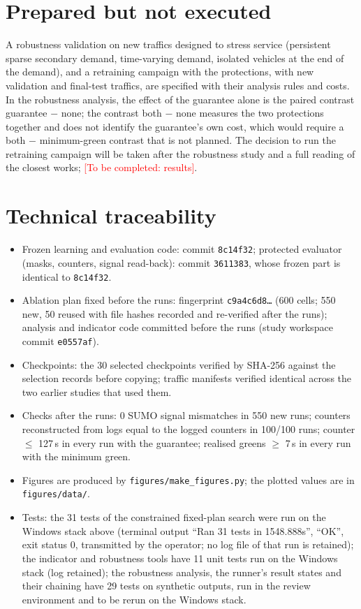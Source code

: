 \documentclass[11pt]{article}
\newcommand{\tocomplete}[1]{\textcolor{red}{[To be completed: #1]}}
\begin{document}
\section*{Prepared but not executed}
A robustness validation on new traffics designed to stress service (persistent sparse secondary demand,
time-varying demand, isolated vehicles at the end of the demand), and a retraining campaign with the
protections, with new validation and final-test traffics, are specified with their analysis rules and costs.
In the robustness analysis, the effect of the guarantee alone is the paired contrast guarantee $-$ none; the
contrast both $-$ none measures the two protections together and does not identify the guarantee's own cost,
which would require a both $-$ minimum-green contrast that is not planned.
The decision to run the retraining campaign will be taken after the robustness study and a full reading of the
closest works; \tocomplete{results}.

\appendix
\section{Technical traceability}\label{app:trace}
\begin{itemize}
\item Frozen learning and evaluation code: commit \texttt{8c14f32}; protected evaluator (masks, counters,
signal read-back): commit \texttt{3611383}, whose frozen part is identical to \texttt{8c14f32}.
\item Ablation plan fixed before the runs: fingerprint \texttt{c9a4c6d8\ldots} (600 cells; 550 new, 50 reused
with file hashes recorded and re-verified after the runs); analysis and indicator code committed before the
runs (study workspace commit \texttt{e0557af}).
\item Checkpoints: the 30 selected checkpoints verified by SHA-256 against the selection records before
copying; traffic manifests verified identical across the two earlier studies that used them.
\item Checks after the runs: 0 SUMO signal mismatches in 550 new runs; counters reconstructed from logs equal
to the logged counters in 100/100 runs; counter $\le$ 127\,s in every run with the guarantee; realised greens
$\ge$ 7\,s in every run with the minimum green.
\item Figures are produced by \texttt{figures/make\_figures.py}; the plotted values are in
\texttt{figures/data/}.
\item Tests: the 31 tests of the constrained fixed-plan search were run on the Windows stack above (terminal
output ``Ran 31 tests in 1548.888s'', ``OK'', exit status 0, transmitted by the operator; no log file of that
run is retained); the indicator and robustness tools have 11 unit tests run on the Windows stack (log retained);
the robustness analysis, the runner's result states and their chaining have 29 tests on synthetic outputs,
run in the review environment and to be rerun on the Windows stack.
\end{itemize}



\end{document}
